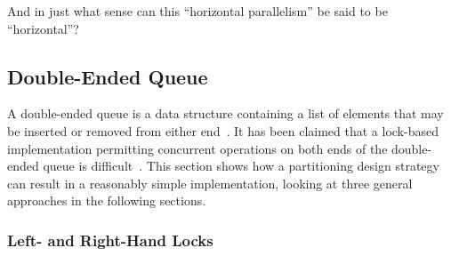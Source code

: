 \QuickQuiz{}
	And in just what sense can this ``horizontal parallelism'' be
	said to be ``horizontal''?
 \QuickQuizEnd

\subsection{Double-Ended Queue}
\label{sec:SMPdesign:Double-Ended Queue}

A double-ended queue is a data structure containing a list of elements
that may be inserted or removed from either end~\cite{Knuth73}.
It has been claimed that a lock-based implementation permitting
concurrent operations on both ends of the double-ended queue is
difficult~\cite{DanGrossman2007TMGCAnalogy}.
This section shows how a partitioning design strategy can result
in a reasonably simple implementation, looking at three
general approaches in the following sections.

\subsubsection{Left- and Right-Hand Locks}
\label{sec:SMPdesign:Left- and Right-Hand Locks}

